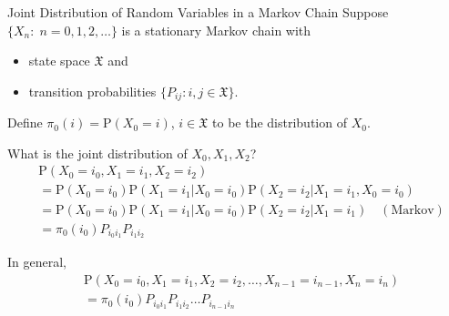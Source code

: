 \documentclass[letterpaper,mathserif,handout]{beamer}
\def\p{\mathrm P}
\def\Sum{\sum\nolimits}
\def\X{\mathfrak{X}}
\begin{document}
\begin{frame}{Joint Distribution of Random Variables in a Markov Chain}
Suppose $\{X_n:\; n=0,1,2,\ldots\}$ is a stationary Markov chain with
\begin{itemize}
\item state space $\X$ and
\item transition probabilities $\{P_{ij}: i,j\in\X\}$.
\end{itemize}
Define $\pi_0(i)=\p(X_0=i)$, $i\in\X$ to be the distribution of $X_0$.
\medskip

What is the joint distribution of $X_0, X_1, X_2$?\pause
\begin{align*}
&\p(X_0=i_0,X_1=i_1,X_2=i_2)\\
&=\p(X_0=i_0)\p(X_1=i_1|X_0=i_0)\p(X_2=i_2|X_1=i_1,X_0=i_0)\\
&=\p(X_0=i_0)\p(X_1=i_1|X_0=i_0)\p(X_2=i_2|X_1=i_1)\quad(\text{Markov})\\
&=\pi_0(i_0)P_{i_0i_1}P_{i_1i_2}
\end{align*}\pause

In general,
\begin{align*}
&\p(X_0=i_0,X_1=i_1,X_2=i_2,\ldots,X_{n-1}=i_{n-1},X_n=i_n)\\
&=\pi_0(i_0)P_{i_0i_1}P_{i_1i_2}\ldots P_{i_{n-1}i_n}
\end{align*}
\end{frame}
\end{document}
